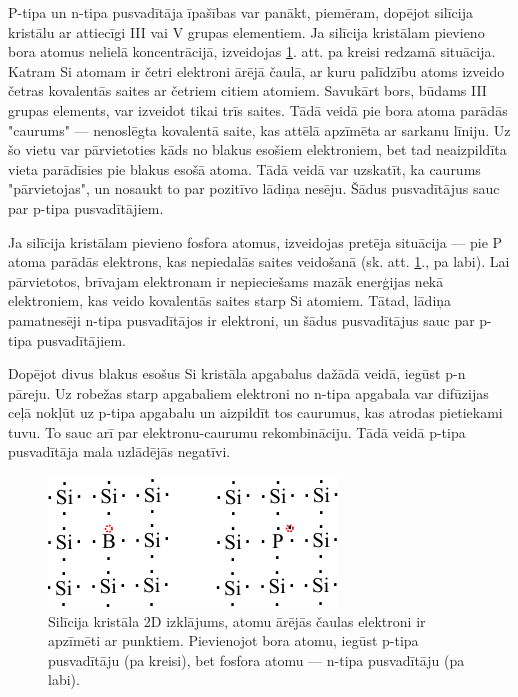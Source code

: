 P-tipa un n-tipa pusvadītāja īpašības var panākt, piemēram, dopējot silīcija kristālu ar attiecīgi III vai V grupas elementiem. Ja silīcija kristālam pievieno bora atomus nelielā koncentrācijā, izveidojas \ref{fig:p-n-type}. att. pa kreisi redzamā situācija. Katram Si atomam ir četri elektroni ārējā čaulā, ar kuru palīdzību atoms izveido četras kovalentās saites ar četriem citiem atomiem. Savukārt bors, būdams III grupas elements, var izveidot tikai trīs saites. Tādā veidā pie bora atoma parādās "caurums" --- nenoslēgta kovalentā saite, kas attēlā apzīmēta ar sarkanu līniju. Uz šo vietu var pārvietoties kāds no blakus esošiem elektroniem, bet tad neaizpildīta vieta parādīsies pie blakus esošā atoma. Tādā veidā var uzskatīt, ka caurums "pārvietojas", un nosaukt to par pozitīvo lādiņa nesēju. Šādus pusvadītājus sauc par p-tipa pusvadītājiem.

Ja silīcija kristālam pievieno fosfora atomus, izveidojas pretēja situācija --- pie P atoma parādās elektrons, kas nepiedalās saites veidošanā (sk. att. \ref{fig:p-n-type}., pa labi). Lai pārvietotos, brīvajam elektronam ir nepieciešams mazāk enerģijas nekā elektroniem, kas veido kovalentās saites starp Si atomiem. Tātad, lādiņa pamatnesēji n-tipa pusvadītājos ir elektroni, un šādus pusvadītājus sauc par p-tipa pusvadītājiem.

Dopējot divus blakus esošus Si kristāla apgabalus dažādā veidā, iegūst p-n pāreju. Uz robežas starp apgabaliem elektroni no n-tipa apgabala var difūzijas ceļā nokļūt uz p-tipa apgabalu un aizpildīt tos caurumus, kas atrodas pietiekami tuvu. To sauc arī par elektronu-caurumu rekombināciju. Tādā veidā p-tipa pusvadītāja mala uzlādējās negatīvi. 

\begin{figure}[h]
	\centering
	\includegraphics[width=0.5\linewidth]{figures/misc/p_n_type.pdf}
	\caption{Silīcija kristāla 2D izklājums, atomu ārējās čaulas elektroni ir apzīmēti ar punktiem. Pievienojot bora atomu, iegūst p-tipa pusvadītāju (pa kreisi), bet fosfora atomu --- n-tipa pusvadītāju (pa labi).}
	\label{fig:p-n-type}
\end{figure}





